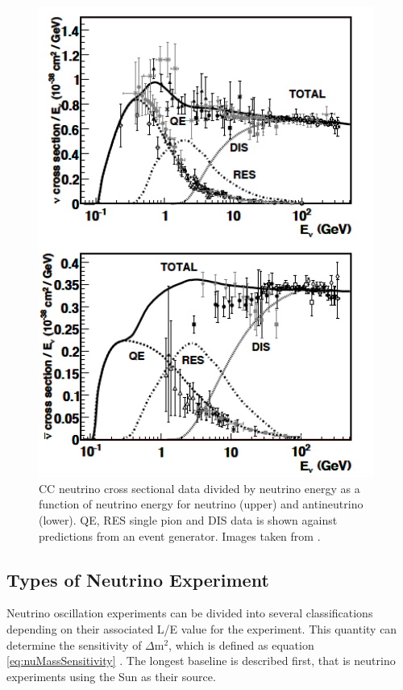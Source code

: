 \begin{figure}[htbp]
\begin{center}
\includegraphics[width=110mm]{Introduction/IntroductionFigs/nuCrossSectionZeller2.png}
\caption{CC neutrino cross sectional data divided by neutrino energy as a function of neutrino energy for neutrino (upper) and antineutrino (lower). QE, RES single pion and DIS data is shown against predictions from an event generator. Images taken from \cite{neutrinoCrossSections}.}
\label{fig:nuCrossSectionsZeller}
\end{center}
\end{figure}

\subsection{Types of Neutrino Experiment}
Neutrino oscillation experiments can be divided into several classifications depending on their associated L/E value for the experiment. This quantity can determine the sensitivity of $\Delta$m$^{2}$, which is defined as equation \ref{eq:nuMassSensitivity} \cite{giuntiNeutrino}. The longest baseline is described first, that is neutrino experiments using the Sun as their source.

